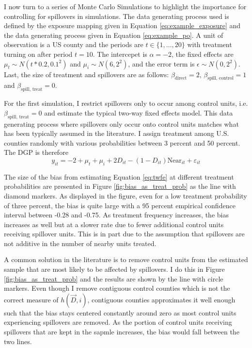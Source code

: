 \documentclass[11pt]{article}
\begin{document}
I now turn to a series of Monte Carlo Simulations to highlight the importance for controlling for spillovers in simulations. The data generating process used is defined by the exposure mapping given in Equation \ref{eq:example_exposure} and the data generating process given in Equation \ref{eq:example_po}. A unit of observation is a US county and the periods are $t \in \{1, \dots, 20\}$ with treatment turning on after period $t = 10$. The intercepet is $\alpha = -2$, the fixed effects are $\mu_t \sim N(t * 0.2, 0.1^2)$ and $\mu_i \sim N(6, 2^2)$, and the error term is $\epsilon \sim N(0, 2^2)$. Last, the size of treatment and spillovers are as follows: $\beta_{\text{direct}} = 2$, $\beta_{\text{spill, control}} = 1$ and $\beta_{\text{spill, treat}} = 0$.

For the first simulation, I restrict spillovers only to occur among control units, i.e. $\beta_{\text{spill, treat}} = 0$ and estimate the typical two-way fixed effects model. This data generating process where spillovers only occur onto control units matches what has been typically assumed in the literature. I assign treatment among U.S. counties randomly with various probabilities between 3 percent and 50 percent. The DGP is therefore 
\begin{equation}
    \label{dgp1} 
    y_{it} = -2 + \mu_t + \mu_i + 2 D_{it} - (1-D_{it}) \text{Near}_{it} + \varepsilon_{it}   
\end{equation}

The size of the bias from estimating Equation \ref{eq:twfe} at different treatment probabilities are presented in Figure \ref{fig:bias_as_treat_prob} as the line with diamond markers. As displayed in the figure, even for a low treatment probability of three percent, the bias is quite large with a 95 percent empirical confidence interval between -0.28 and -0.75. As treatment frequency increases, the bias increases as well but at a slower rate due to fewer additional control units receiving spillover units. This is in part due to the assumption that spillovers are not additive in the number of nearby units treated.

A common solution in the literature is to remove control units from the estimated sample that are most likely to be affected by spillovers. I do this in Figure \ref{fig:bias_as_treat_prob} and the results are shown by the line with circle markers. Even though I remove contiguous control counties which is not the correct measure of $h(\vec{D}, i)$, contiguous counties approximates it well enough such that the bias stays centered constantly around zero as most control units experiencing spillovers are removed. As the portion of control units receiving spillovers that are kept in the sapmle increases, the bias would fall between the two lines.
\end{document}
